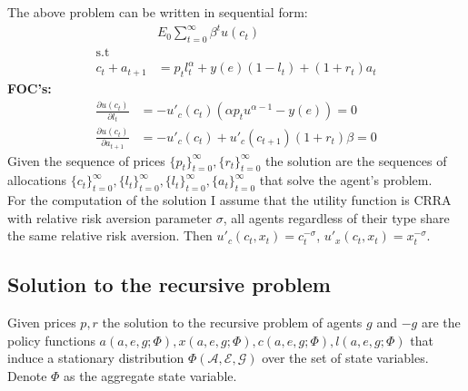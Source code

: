 \noindent The above problem can be written in sequential form: 
\begin{align*}
\mathop{\max_{c_{t},l_{t},a_{t+1}}}&E_{0}\sum^{\infty}_{t=0}\beta^{t}u(c_{t})  \\
\mbox{s.t}\\ 
c_{t}+a_{t+1}&=p_{t}l_{t}^{\alpha}+y(e)(1-l_{t})+(1+r_{t})a_{t}
\end{align*}
 \textbf{FOC's:}\\
 \begin{align*}
 \frac{\partial u(c_{t})}{\partial l_{t}}&=-u'_{c}(c_{t})(\alpha p_{t} u^{\alpha-1}-y(e))=0\\
 \frac{\partial u(c_{t})}{\partial a_{t+1}}&=-u'_{c}(c_{t})+u'_{c}(c_{t+1})(1+r_{t})\beta=0
 \end{align*}
 Given the sequence of prices $\{p_{t}\}_{t=0}^{\infty},\{r_{t}\}_{t=0}^{\infty}$ the solution are the sequences of allocations $\{c_{t}\}_{t=0}^{\infty},\{l_{t}\}_{t=0}^{\infty}, \{l_{t}\}_{t=0}^{\infty}, \{a_{t}\}_{t=0}^{\infty}$ that solve  the agent's problem.\\
For the computation of the solution I assume that the utility function is CRRA with relative risk aversion parameter $\sigma$, all agents regardless of their type share the same relative risk aversion. Then $u'_{c}(c_{t},x_{t})=c_{t}^{-\sigma}$, $u'_{x}(c_{t},x_{t})=x_{t}^{-\sigma}$.
\subsection*{Solution to the recursive problem}
 Given prices $p,r$ the solution to the recursive problem of agents $g$ and $-g$  are the policy functions $a(a,e,g;\Phi), x(a,e,g;\Phi), c(a,e,g;\Phi), l(a,e,g;\Phi)$ that induce a stationary distribution $\Phi(\mathcal{A,E,G})$ over the set of state variables. Denote $\Phi$ as the aggregate state variable.
